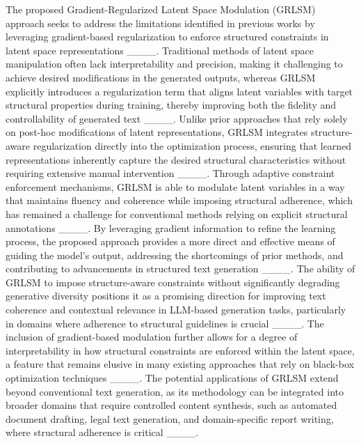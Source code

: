 The proposed Gradient-Regularized Latent Space Modulation (GRLSM) approach seeks to address the limitations identified in previous works by leveraging gradient-based regularization to enforce structured constraints in latent space representations ____. Traditional methods of latent space manipulation often lack interpretability and precision, making it challenging to achieve desired modifications in the generated outputs, whereas GRLSM explicitly introduces a regularization term that aligns latent variables with target structural properties during training, thereby improving both the fidelity and controllability of generated text ____. Unlike prior approaches that rely solely on post-hoc modifications of latent representations, GRLSM integrates structure-aware regularization directly into the optimization process, ensuring that learned representations inherently capture the desired structural characteristics without requiring extensive manual intervention ____. Through adaptive constraint enforcement mechanisms, GRLSM is able to modulate latent variables in a way that maintains fluency and coherence while imposing structural adherence, which has remained a challenge for conventional methods relying on explicit structural annotations ____. By leveraging gradient information to refine the learning process, the proposed approach provides a more direct and effective means of guiding the model’s output, addressing the shortcomings of prior methods, and contributing to advancements in structured text generation ____. The ability of GRLSM to impose structure-aware constraints without significantly degrading generative diversity positions it as a promising direction for improving text coherence and contextual relevance in LLM-based generation tasks, particularly in domains where adherence to structural guidelines is crucial ____. The inclusion of gradient-based modulation further allows for a degree of interpretability in how structural constraints are enforced within the latent space, a feature that remains elusive in many existing approaches that rely on black-box optimization techniques ____. The potential applications of GRLSM extend beyond conventional text generation, as its methodology can be integrated into broader domains that require controlled content synthesis, such as automated document drafting, legal text generation, and domain-specific report writing, where structural adherence is critical ____.